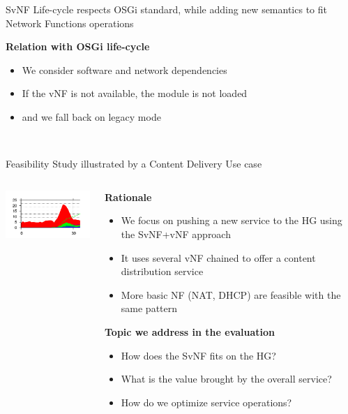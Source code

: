 \documentclass[a4paper]{beamer}
\begin{document}
\begin{frame}{SvNF Life-cycle respects OSGi standard, while adding new semantics to fit Network Functions operations}
	\begin{flushleft}	
		\textbf{Relation with OSGi life-cycle}
		\begin{itemize}
			\item We consider software and network dependencies
			\item If the vNF is not available, the module is not loaded
			\item and we fall back on legacy mode
		\end{itemize}
	\end{flushleft}
	\vspace{2em}
	\centering
	\\
\end{frame}


\begin{frame}{Feasibility Study illustrated by a Content Delivery Use case}
	\begin{columns}[T]
		\begin{column}[T]{0.33 \textwidth} 
			\vspace{1.5cm}
			\includegraphics[width=12em]{results.png}
		\end{column}
										
		\begin{column}[T]{0.66\textwidth} 
										   
			\textbf{Rationale}
			\begin{itemize}
				\item We focus on pushing a new service to the HG using the SvNF+vNF approach
				\item It uses several vNF chained to offer a content distribution service
				\item More basic NF (NAT, DHCP) are feasible with the same pattern
			\end{itemize}
			\vspace{3mm}
			\textbf{Topic we address in the evaluation}
			\begin{itemize}
				\item How does the SvNF fits on the HG?
				\item What is the value brought by the overall service?
				\item How do we optimize service operations?
			\end{itemize}
		\end{column}
																										
	\end{columns}
								
\end{frame}
\end{document}
